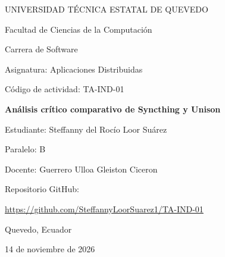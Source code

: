\documentclass[12pt,a4paper]{article}
\begin{document}
\begin{titlepage}
    \centering

    {\Large UNIVERSIDAD TÉCNICA ESTATAL DE QUEVEDO\par}
    \vspace{0.5cm}

    {\large Facultad de Ciencias de la Computación\par}
    {\large Carrera de Software\par}

    \vspace{1.5cm}

    {\large Asignatura: Aplicaciones Distribuidas\par}
    {\large Código de actividad: TA-IND-01\par}

    \vspace{1.5cm}

    {\LARGE\bfseries
    Análisis crítico comparativo de Syncthing y Unison\par}

    \vspace{1.5cm}

    {\large Estudiante: Steffanny del Rocío Loor Suárez\par}
    {\large Paralelo: B\par}
    {\large Docente: Guerrero Ulloa Gleiston Ciceron\par}

    \vfill

    {\small Repositorio GitHub:\par}
    {\small
    \url{https://github.com/SteffannyLoorSuarez1/TA-IND-01}
    \par}

    \vspace{1cm}

    {\large Quevedo, Ecuador\par}
    {\large 14 de noviembre de 2026\par}

\end{titlepage}
\end{document}

